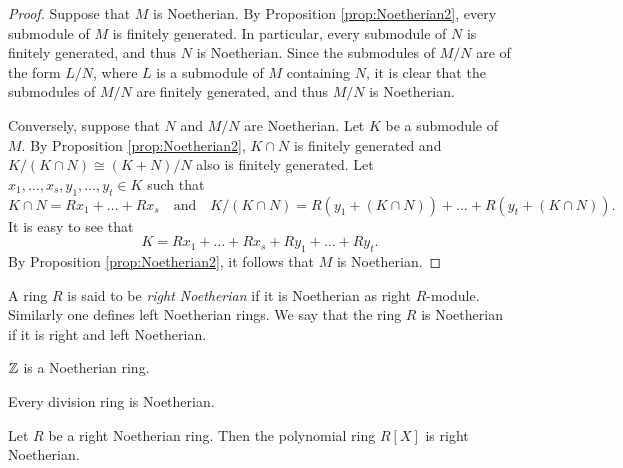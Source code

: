 \begin{proof}
Suppose that $M$ is Noetherian. By Proposition \ref{prop:Noetherian2}, every submodule of $M$ is finitely generated. In particular, every submodule of $N$ is finitely generated, and thus $N$ is Noetherian. Since the submodules of $M/N$ are of the form $L/N$, where $L$ is a submodule of $M$ containing $N$, it is clear that the submodules of $M/N$ are finitely generated, and thus $M/N$ is Noetherian.

Conversely, suppose that $N$ and $M/N$ are Noetherian. Let $K$ be a submodule of $M$. By Proposition \ref{prop:Noetherian2}, $K\cap N$ is finitely generated and $K/(K\cap N)\cong (K+N)/N$ also is finitely generated. Let $x_1,\dots ,x_s,y_1,\dots ,y_t\in K$ such that
\[K\cap N=Rx_1+\dots +Rx_s\quad\text{and}\quad K/(K\cap N)=R(y_1+(K\cap N))+\dots +R(y_t+(K\cap N)).\]
It is easy to see that
\[K=Rx_1+\dots +Rx_s+Ry_1+\dots +Ry_t.\]
By Proposition \ref{prop:Noetherian2}, it follows that $M$ is Noetherian.
\end{proof}

A ring $R$ is said to be \emph{right Noetherian} if it is Noetherian as right $R$-module.
Similarly one defines left Noetherian rings. We say that the ring $R$ is Noetherian if it is right and left Noetherian.

\begin{example}
$\mathbb{Z}$ is a Noetherian ring.
\end{example}

\begin{example}
Every division ring is Noetherian.
\end{example}

\begin{theorem}\label{thm:Noetherian4}
Let $R$ be a right Noetherian ring. Then the polynomial ring $R[X]$ is right Noetherian.
\end{theorem}


